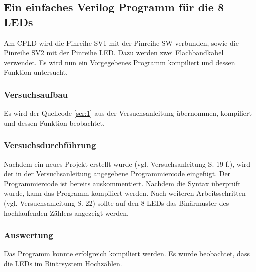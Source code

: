 \documentclass[12pt,a4paper]{article}
\begin{document}
\subsection{Ein einfaches Verilog Programm für die 8 LEDs}
Am CPLD wird die Pinreihe SV1 mit der Pinreihe SW verbunden, sowie die Pinreihe SV2 mit der Pinreihe LED. Dazu werden zwei Flachbandkabel verwendet. Es wird nun ein Vorgegebenes Programm kompiliert und dessen Funktion untersucht.
\subsubsection*{Versuchsaufbau}
Es wird der Quellcode \ref{scr:1} aus der Versuchsanleitung übernommen, kompiliert und dessen Funktion beobachtet.
\subsubsection*{Versuchsdurchführung}
Nachdem ein neues Projekt erstellt wurde (vgl. Versuchsanleitung S. 19 f.), wird der in der Versuchsanleitung angegebene Programmiercode eingefügt. Der Programmiercode ist bereits auskommentiert. Nachdem die Syntax überprüft wurde, kann das Programm kompiliert werden. Nach weiteren Arbeitsschritten (vgl. Versuchsanleitung S. 22) sollte auf den 8 LEDs das Binärmuster des hochlaufenden Zählers angezeigt werden.

\subsubsection*{Auswertung}
Das Programm konnte erfolgreich kompiliert werden. 
Es wurde beobachtet, dass die LEDs im Binärsystem Hochzählen.
\end{document}
